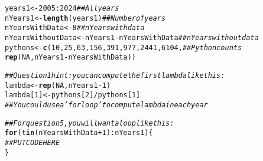 \documentclass[12pt]{article}\usepackage[]{graphicx}\usepackage[]{xcolor}
\makeatletter
\newcommand{\hlnum}[1]{\textcolor[rgb]{0.686,0.059,0.569}{#1}}%
\newcommand{\hlcom}[1]{\textcolor[rgb]{0.678,0.584,0.686}{\textit{#1}}}%
\newcommand{\hlopt}[1]{\textcolor[rgb]{0,0,0}{#1}}%
\newcommand{\hldef}[1]{\textcolor[rgb]{0.345,0.345,0.345}{#1}}%
\newcommand{\hlkwa}[1]{\textcolor[rgb]{0.161,0.373,0.58}{\textbf{#1}}}%
\newcommand{\hlkwb}[1]{\textcolor[rgb]{0.69,0.353,0.396}{#1}}%
\newcommand{\hlkwd}[1]{\textcolor[rgb]{0.737,0.353,0.396}{\textbf{#1}}}%
\newenvironment{kframe}{%
 \def\at@end@of@kframe{}%
 \ifinner\ifhmode%
  \def\at@end@of@kframe{\end{minipage}}%
  \begin{minipage}{\columnwidth}%
 \fi\fi%
 \def\FrameCommand##1{\hskip\@totalleftmargin \hskip-\fboxsep
 \colorbox{shadecolor}{##1}\hskip-\fboxsep
     \hskip-\linewidth \hskip-\@totalleftmargin \hskip\columnwidth}%
 \MakeFramed {\advance\hsize-\width
   \@totalleftmargin\z@ \linewidth\hsize
   \@setminipage}}%
 {\par\unskip\endMakeFramed%
 \at@end@of@kframe}
\newenvironment{knitrout}{}{} %
\makeatother
\begin{document}
\begin{knitrout}
\color{fgcolor}\begin{kframe}
\begin{alltt}
\hldef{years1} \hlkwb{<-} \hlnum{2005}\hlopt{:}\hlnum{2024}                                  \hlcom{## All years}
\hldef{nYears1} \hlkwb{<-} \hlkwd{length}\hldef{(years1)}                            \hlcom{## Number of years}
\hldef{nYearsWithData} \hlkwb{<-} \hlnum{8}                                  \hlcom{## nYears with data}
\hldef{nYearsWithoutData} \hlkwb{<-} \hldef{nYears1}\hlopt{-}\hldef{nYearsWithData}          \hlcom{## nYears without data}
\hldef{pythons} \hlkwb{<-} \hlkwd{c}\hldef{(}\hlnum{10}\hldef{,} \hlnum{25}\hldef{,} \hlnum{63}\hldef{,} \hlnum{156}\hldef{,} \hlnum{391}\hldef{,} \hlnum{977}\hldef{,} \hlnum{2441}\hldef{,} \hlnum{6104}\hldef{,}  \hlcom{## Python counts}
             \hlkwd{rep}\hldef{(}\hlnum{NA}\hldef{, nYears1}\hlopt{-}\hldef{nYearsWithData))}

\hlcom{## Question 1 hint: you can compute the first lambda like this:}
\hldef{lambda} \hlkwb{<-} \hlkwd{rep}\hldef{(}\hlnum{NA}\hldef{, nYears1}\hlopt{-}\hlnum{1}\hldef{)}
\hldef{lambda[}\hlnum{1}\hldef{]} \hlkwb{<-} \hldef{pythons[}\hlnum{2}\hldef{]}\hlopt{/}\hldef{pythons[}\hlnum{1}\hldef{]}
\hlcom{## You could use a 'for loop' to compute lambda in each year}

\hlcom{## For question 5, you will want a loop like this:}
\hlkwa{for}\hldef{(t} \hlkwa{in} \hldef{(nYearsWithData}\hlopt{+}\hlnum{1}\hldef{)}\hlopt{:}\hldef{nYears1) \{}
   \hlcom{## PUT CODE HERE}
\hldef{\}}
\end{alltt}
\end{kframe}
\end{knitrout}



\clearpage
\end{document}
